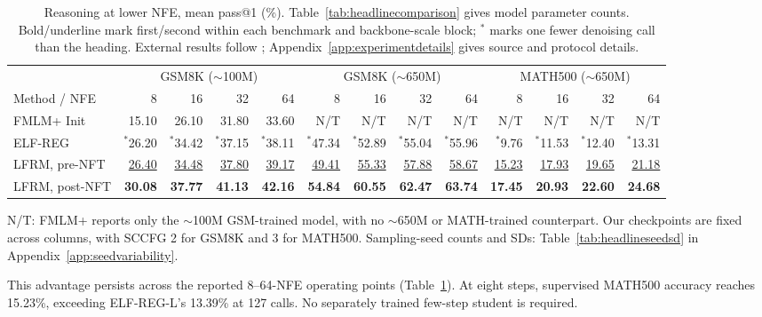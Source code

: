 \documentclass{article}
\newcommand{\rev}[1]{{\color{blue}#1}}
\newcommand{\revp}[1]{\par\color{blue}#1\par\color{black}}
\begin{document}
\begin{table}[!htb]
\caption{Reasoning at lower NFE, mean pass@1 (\%). Table~\ref{tab:headlinecomparison} gives model parameter counts. Bold/underline mark first/second within each benchmark and backbone-scale block; $^{*}$ marks one fewer denoising call than the heading. External results follow \citet{posterior,scalingdlm}; Appendix~\ref{app:experimentdetails} gives source and protocol details.}
\label{tab:headlinelownfe}
\centering\small
\setlength{\tabcolsep}{1.7pt}
\begin{tabular}{@{}l*{12}{r}@{}}
\toprule
& \multicolumn{4}{c}{GSM8K ($\sim$100M)} & \multicolumn{4}{c}{GSM8K ($\sim$650M)} & \multicolumn{4}{c}{MATH500 ($\sim$650M)}\\
\cmidrule(lr){2-5}\cmidrule(lr){6-9}\cmidrule(lr){10-13}
Method / NFE & 8 & 16 & 32 & 64 & 8 & 16 & 32 & 64 & 8 & 16 & 32 & 64\\
\midrule
FMLM+ Init & 15.10 & 26.10 & 31.80 & 33.60 & \rev{N/T} & \rev{N/T} & \rev{N/T} & \rev{N/T} & \rev{N/T} & \rev{N/T} & \rev{N/T} & \rev{N/T}\\
ELF-REG & $^{*}$26.20 & $^{*}$34.42 & $^{*}$37.15 & $^{*}$38.11 & $^{*}$47.34 & $^{*}$52.89 & $^{*}$55.04 & $^{*}$55.96 & $^{*}$9.76 & $^{*}$11.53 & $^{*}$12.40 & $^{*}$13.31\\
LFRM, pre-NFT & \underline{26.40} & \underline{34.48} & \underline{37.80} & \underline{39.17} & \underline{49.41} & \underline{55.33} & \underline{57.88} & \underline{58.67} & \underline{15.23} & \underline{17.93} & \underline{19.65} & \underline{21.18}\\
LFRM, post-NFT & \textbf{30.08} & \textbf{37.77} & \textbf{41.13} & \textbf{42.16} & \textbf{54.84} & \textbf{60.55} & \textbf{62.47} & \textbf{63.74} & \textbf{17.45} & \textbf{20.93} & \textbf{22.60} & \textbf{24.68}\\
\bottomrule
\end{tabular}
\vspace{3pt}
\parbox{\linewidth}{\footnotesize \rev{N/T: FMLM+ reports only the $\sim$100M GSM-trained model, with no $\sim$650M or MATH-trained counterpart.} Our checkpoints are fixed across columns, with SCCFG 2 for GSM8K and 3 for MATH500. Sampling-seed counts and SDs: Table~\ref{tab:headlineseedsd} in Appendix~\ref{app:seedvariability}.}
\end{table}

\revp{This advantage persists across the reported 8--64-NFE operating points (Table~\ref{tab:headlinelownfe}). At eight steps, supervised MATH500 accuracy reaches 15.23\%, exceeding ELF-REG-L's 13.39\% at 127 calls. No separately trained few-step student is required.}
\end{document}
